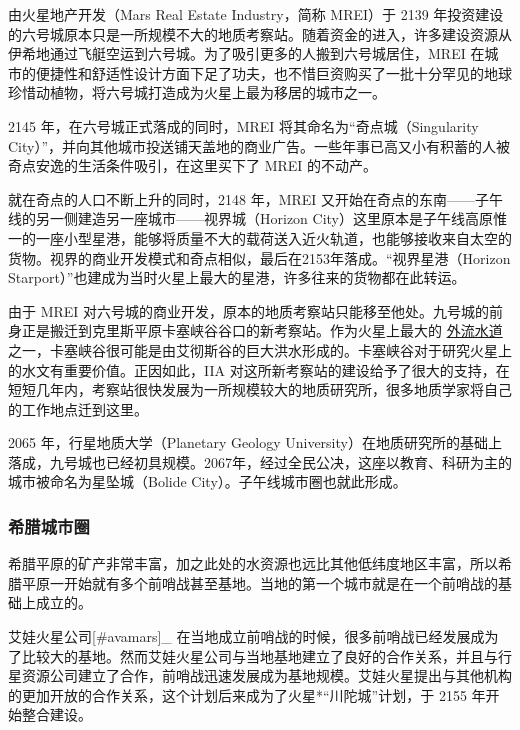 \documentclass[letterpaper,10pt]{sphinxmanual}
\begin{document}
由火星地产开发（Mars Real Estate Industry，简称 MREI）于 2139 年投资建设的六号城原本只是一所规模不大的地质考察站。随着资金的进入，许多建设资源从伊希地通过飞艇空运到六号城。为了吸引更多的人搬到六号城居住，MREI 在城市的便捷性和舒适性设计方面下足了功夫，也不惜巨资购买了一批十分罕见的地球珍惜动植物，将六号城打造成为火星上最为移居的城市之一。

2145 年，在六号城正式落成的同时，MREI 将其命名为“奇点城（Singularity City）”，并向其他城市投送铺天盖地的商业广告。一些年事已高又小有积蓄的人被奇点安逸的生活条件吸引，在这里买下了 MREI 的不动产。

就在奇点的人口不断上升的同时，2148 年，MREI 又开始在奇点的东南——子午线的另一侧建造另一座城市——视界城（Horizon City）这里原本是子午线高原惟一的一座小型星港，能够将质量不大的载荷送入近火轨道，也能够接收来自太空的货物。视界的商业开发模式和奇点相似，最后在2153年落成。“视界星港（Horizon Starport）”也建成为当时火星上最大的星港，许多往来的货物都在此转运。

由于 MREI 对六号城的商业开发，原本的地质考察站只能移至他处。九号城的前身正是搬迁到克里斯平原卡塞峡谷谷口的新考察站。作为火星上最大的 \href{http://en.wikipedia.org/wiki/Outflow\_channels}{外流水道} 之一，卡塞峡谷很可能是由艾彻斯谷的巨大洪水形成的。卡塞峡谷对于研究火星上的水文有重要价值。正因如此，IIA 对这所新考察站的建设给予了很大的支持，在短短几年内，考察站很快发展为一所规模较大的地质研究所，很多地质学家将自己的工作地点迁到这里。

2065 年，行星地质大学（Planetary Geology University）在地质研究所的基础上落成，九号城也已经初具规模。2067年，经过全民公决，这座以教育、科研为主的城市被命名为星坠城（Bolide City）。子午线城市圈也就此形成。


\subsubsection{希腊城市圈}
\label{cities:id7}\label{cities:index-32}
希腊平原的矿产非常丰富，加之此处的水资源也远比其他低纬度地区丰富，所以希腊平原一开始就有多个前哨战甚至基地。当地的第一个城市就是在一个前哨战的基础上成立的。

艾娃火星公司{[}\#avamars{]}\_ 在当地成立前哨战的时候，很多前哨战已经发展成为了比较大的基地。然而艾娃火星公司与当地基地建立了良好的合作关系，并且与行星资源公司建立了合作，前哨战迅速发展成为基地规模。艾娃火星提出与其他机构的更加开放的合作关系，这个计划后来成为了火星*“川陀城”计划，于 2155 年开始整合建设。
\end{document}
